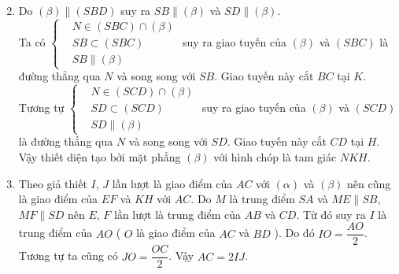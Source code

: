 \begin{bt}
\begin{bt}
{{
		}
		\noindent
		\begin{enumerate}
			\setcounter{enumi}{1}
			\item Do $\left(\beta \right)\parallel (SBD)$ suy ra $SB\parallel \left(\beta \right)$ và $SD\parallel \left(\beta \right)$. \\
			Ta có $\left\{\begin{aligned} &N\in (SBC)\cap \left(\beta \right) \\ &SB\subset (SBC) \\ &SB\parallel \left(\beta \right)
			\end{aligned}\right.$ suy ra giao tuyến của $\left(\beta \right)$ và $(SBC)$ là đường thẳng qua $N$ và song song với $SB$. Giao tuyến này cắt $BC$ tại $K$. \\
			Tương tự $\left\{\begin{aligned} &N\in (SCD)\cap \left(\beta \right) \\ &SD\subset (SCD) \\ &SD\parallel \left(\beta \right)
			\end{aligned}\right.$ suy ra giao tuyến của $\left(\beta \right)$ và $(SCD)$ là đường thẳng qua $N$ và song song với $SD$. Giao tuyến này cắt $CD$ tại $H$. \\
			Vậy thiết diện tạo bởi mặt phẳng $\left(\beta \right)$ với hình chóp là tam giác $NKH$.
			\item Theo giả thiết $I$, $J$ lần lượt là giao điểm của $AC$ với $\left(\alpha \right)$ và $\left(\beta \right)$ nên cũng là giao điểm của $EF$ và $KH$ với $AC$. Do $M$ là trung điểm $SA$ và $ME\parallel SB$, $MF\parallel SD$ nên $E$, $F$ lần lượt là trung điểm của $AB$ và $CD$. Từ đó suy ra $I$ là trung điểm của $AO$ ( $O$ là giao điểm của $AC$ và $BD$ ). Do đó $IO=\dfrac{AO}{2}$. \\
			Tương tự ta cũng có $JO=\dfrac{OC}{2}$. Vậy $AC=2IJ$.
		\end{enumerate}
	}
\end{bt}


\end{bt}
